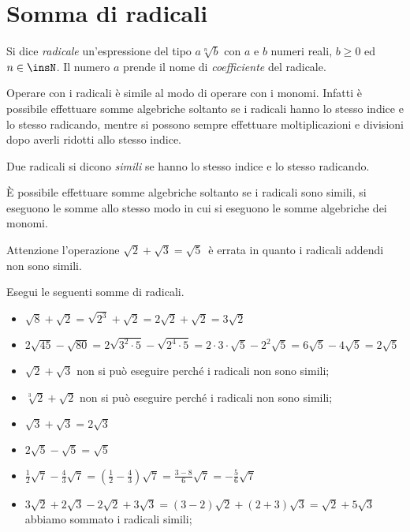 \section{Somma di radicali}
\label{sec:radicali_somma}

Si dice \emph{radicale} un'espressione del tipo $a\sqrt[n]b$ con $a$ e $b$ 
numeri reali, $b{\geq}0$ ed $n\in \insN$. Il numero $a$ prende il nome di 
\emph{coefficiente} del radicale.

Operare con i radicali è simile al modo di operare con i monomi. Infatti è 
possibile effettuare somme algebriche soltanto se i radicali hanno lo 
stesso 
indice e lo stesso radicando, mentre si possono sempre effettuare 
moltiplicazioni e divisioni dopo averli ridotti allo stesso indice.
\begin{definizione}
 Due radicali si dicono \emph{simili} se hanno lo stesso indice e lo stesso 
 radicando.
\end{definizione}

È possibile effettuare somme algebriche soltanto se i radicali sono simili, 
si eseguono le somme allo stesso modo in cui si eseguono le somme 
algebriche 
dei monomi.

Attenzione l'operazione $\sqrt{2}+\sqrt{3}=\sqrt 5$\, è errata in quanto i 
radicali addendi non sono simili.

\newpage %

 \begin{esempio}
Esegui le seguenti somme di radicali.
\begin{itemize}
 \item $\sqrt 8+\sqrt{2}=\sqrt{2^3}+\sqrt{2}=2\sqrt{2}+\sqrt{2}=3\sqrt{2}$
 \item $2\sqrt{45}-\sqrt{80}=2\sqrt{3^2\cdot 5}-\sqrt{2^4\cdot 5}=
        2\cdot 3\cdot \sqrt 5-2^2\sqrt 5=6\sqrt 5-4\sqrt 5=2\sqrt 5$
 \item $\sqrt{2}+\sqrt{3}$
  non si può eseguire perché i radicali non sono simili;
 \item $\sqrt[3]2+\sqrt{2}$
  non si può eseguire perché i radicali non sono simili;
 \item $\sqrt{3}+\sqrt{3}=2\sqrt{3}$
 \item $2\sqrt 5-\sqrt 5=\sqrt 5$
 \item $\frac 1 2\sqrt 7-\frac 4 3\sqrt 7=
        \left(\frac 1 2-\frac 4 3\right)\sqrt 7=\frac{3-8} 6\sqrt 7=
        -\frac 5 6\sqrt 7$
 \item $3\sqrt{2}+2\sqrt{3}-2\sqrt{2}+3\sqrt{3}=(3-2)\sqrt{2}+(2+3)\sqrt{3}=
        \sqrt{2}+5\sqrt{3}$ abbiamo sommato i radicali simili;
\end{itemize}
 \end{esempio}

